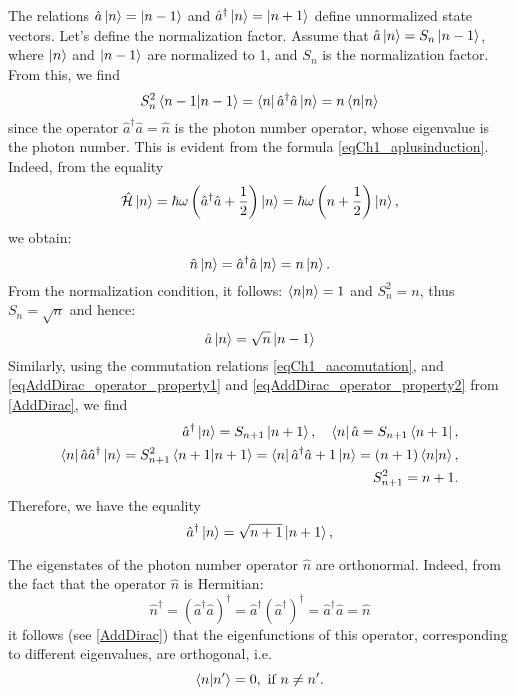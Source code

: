 The relations 
$\hat{a} \ket{n} = \ket{n - 1}$
and
$\hat{a}^{\dag} \ket{n} = \ket{n + 1}$
define unnormalized state vectors. Let's define the normalization factor. Assume that  
$\hat{a} \ket{n} = S_n \ket{n - 1}$, where 
$\ket{n}$ and $\ket{n - 1}$ are normalized to 1, and $S_n$
is the normalization factor. From this, we find 
\[
S_n^2\bra{n - 1}\ket{n - 1} =
\bra{n}\hat{a}^{\dag}\hat{a}\ket{n} = 
n  \bra{n}\ket{n}
\]
since the operator    
$\hat{a}^{\dag}\hat{a} = \hat{n}$
is the photon number operator, whose eigenvalue is the photon number. This is evident from the formula
\eqref{eqCh1_aplusinduction}. Indeed, from the equality
\[
\hat{\mathcal{H}} \ket{n} =
\hbar \omega \left(
\hat{a}^{\dag}\hat{a} + \frac{1}{2}
\right)
\ket{n} = 
\hbar \omega \left(n + \frac{1}{2}\right)
\ket{n},
\]
we obtain:
\[
\hat{n}\ket{n} = \hat{a}^{\dag}\hat{a} \ket{n} = n
\ket{n}. 
\]
From the normalization condition, it follows: $\bra{n}\ket{n} = 1$   and
$S_n^2 = n$, thus $S_n = \sqrt{n}$ and hence: 
\begin{equation}
\hat{a}\ket{n} = \sqrt{n}\ket{n - 1}
\end{equation}
Similarly, using the commutation relations
\eqref{eqCh1_aacomutation}, and \ref{eqAddDirac_operator_property1} and
  \ref{eqAddDirac_operator_property2} from \autoref{AddDirac},
  we find 
\begin{eqnarray}
\hat{a}^{\dag}\ket{n} = S_{n+1}\ket{n + 1},
\quad 
\bra{n}\hat{a} = S_{n + 1}\bra{n + 1},
\nonumber \\
\bra{n}\hat{a}\hat{a}^{\dag}\ket{n} = S_{n+1}^2
\bra{n + 1}\ket{n + 1} = 
\bra{n}\hat{a}^{\dag}\hat{a} + 1\ket{n} = 
\left(n + 1\right)\bra{n}\ket{n},
\nonumber \\
S_{n+1}^2 = n + 1.
\end{eqnarray}
Therefore, we have the equality
\begin{equation}
\hat{a}^{\dag}\ket{n} = \sqrt{n + 1}\ket{n + 1},
\end{equation}

The eigenstates of the photon number operator $\hat{n}$ are orthonormal. 
Indeed, from the fact that the operator $\hat{n}$ is Hermitian:
\[
\hat{n}^{\dag} = \left(\hat{a}^{\dag}\hat{a}\right)^{\dag} = 
\hat{a}^{\dag} \left(\hat{a}^{\dag}\right)^{\dag} = 
\hat{a}^{\dag}\hat{a} = \hat{n}
\]
it follows (see \autoref{AddDirac}) that the eigenfunctions of this operator,
corresponding to different eigenvalues, are orthogonal, i.e.
\begin{equation}
\bra{n}\ket{n'} = 0, \mbox{ if } n \ne n'.
\label{eqOrtoN}
\end{equation}

